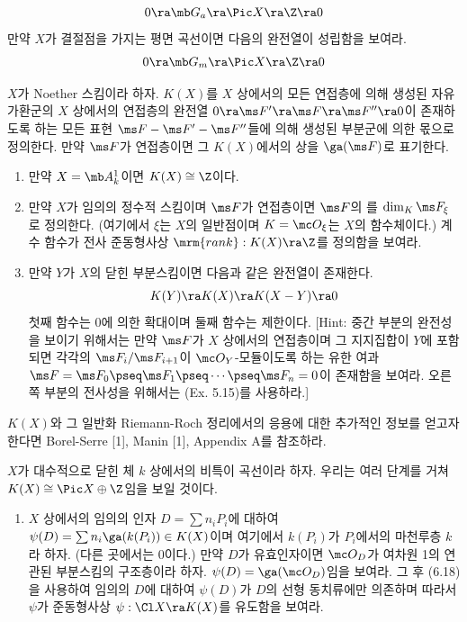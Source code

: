 \begin{enumerate}[label=\tb{6.\arabic*.},itemindent=0mm,itemsep=2mm]
{\begin{enumerate}[label=(\alph*)]
	$$0\ra\mb G_a\ra\Pic X\ra\Z\ra 0$$
	만약 $X$가 결절점을 가지는 평면 곡선이면 다음의 완전열이 성립함을 보여라.
	$$0\ra\mb G_m\ra\Pic X\ra\Z\ra 0$$
	\end{enumerate}}
	\item {} $X$가 Noether 스킴이라 하자. $K(X)$를 $X$ 상에서의 모든 연접층에 의해 생성된 자유가환군의
	$X$ 상에서의 연접층의 완전열 $0\ra\ms F'\ra\ms F\ra\ms F''\ra 0$이 존재하도록 하는
	모든 표현 $\ms F-\ms F'-\ms F''$들에 의해 생성된 부분군에 의한 몫으로 정의한다.
	만약 $\ms F$가 연접층이면 그 $K(X)$에서의 상을 $\ga(\ms F)$로 표기한다.
	\begin{enumerate}[label=(\alph*)]
	\item 만약 $X=\mb A_k^1$이면 $K(X)\cong\Z$이다.
	\item 만약 $X$가 임의의 정수적 스킴이며 $\ms F$가 연접층이면 $\ms F$의 를 $\dim_K\ms F_\xi$로 정의한다.
	(여기에서 $\xi$는 $X$의 일반점이며 $K=\mc O_\xi$는 $X$의 함수체이다.)
	계수 함수가 전사 준동형사상 $\mrm{rank}:K(X)\ra\Z$를 정의함을 보여라.
	\item 만약 $Y$가 $X$의 닫힌 부분스킴이면 다음과 같은 완전열이 존재한다.
	$$K(Y)\ra K(X)\ra K(X-Y)\ra 0$$
	첫째 함수는 0에 의한 확대이며 둘째 함수는 제한이다.
	[Hint: 중간 부분의 완전성을 보이기 위해서는 만약 $\ms F$가 $X$ 상에서의 연접층이며 그 지지집합이 $Y$에 포함되면
	각각의 $\ms F_i/\ms F_{i+1}$이 $\mc O_Y$-모듈이도록 하는
	유한 여과 $\ms F=\ms F_0\pseq\ms F_1\pseq\cdots\pseq\ms F_n=0$이 존재함을 보여라.
	오른쪽 부분의 전사성을 위해서는 (Ex. 5.15)를 사용하라.]
	\end{enumerate}
	$K(X)$와 그 일반화 Riemann-Roch 정리에서의 응용에 대한 추가적인 정보를 얻고자 한다면
	Borel-Serre [1], Manin [1], Appendix A를 참조하라.
	{\renewcommand{\labelenumi}{\tb{*6.\arabic{enumi}.}}
	\item {} $X$가 대수적으로 닫힌 체 $k$ 상에서의 비특이 곡선이라 하자.
	우리는 여러 단계를 거쳐 $K(X)\cong\Pic X\oplus\Z$임을 보일 것이다.
	\begin{enumerate}[label=(\alph*)]
	\item $X$ 상에서의 임의의 인자 $D=\sum n_iP_i$에 대하여 $\psi(D)=\sum n_i\ga(k(P_i))\in K(X)$이며
	여기에서 $k(P_i)$가 $P_i$에서의 마천루층 $k$라 하자. (다른 곳에서는 0이다.)
	만약 $D$가 유효인자이면 $\mc O_D$가 여차원 1의 연관된 부분스킴의 구조층이라 하자. $\psi(D)=\ga(\mc O_D)$임을 보여라.
	그 후 (6.18)을 사용하여 임의의 $D$에 대하여 $\psi(D)$가 $D$의 선형 동치류에만 의존하며
	따라서 $\psi$가 준동형사상 $\psi:\Cl X\ra K(X)$를 유도함을 보여라.

\end{enumerate}}
\end{enumerate}
